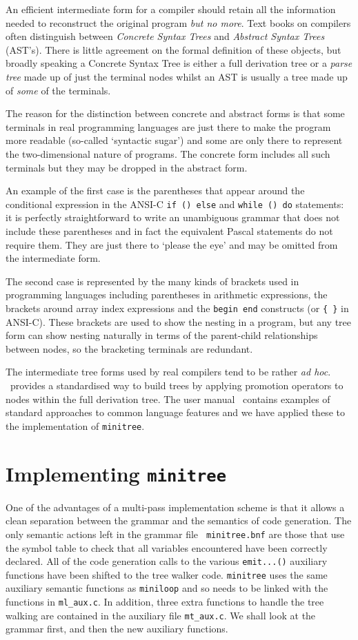 An efficient intermediate form for a compiler should retain all the
information needed to reconstruct the original program {\em but no
more}. Text books on compilers often distinguish between {\em Concrete
Syntax Trees} and {\em Abstract Syntax Trees} (AST's). There is little
agreement on the formal definition of these objects, but broadly
speaking a Concrete Syntax Tree is either a full derivation tree 
or a {\em parse tree} made
up of just the terminal nodes whilst an AST is usually a tree made up of
{\em some} of the terminals.

The reason for the distinction between concrete and abstract forms is that some
terminals in real programming languages are just there to make the
program more readable (so-called `syntactic sugar') and some are only
there to represent the two-dimensional nature of programs. The concrete form includes
all such terminals but they may be dropped in the abstract form.

An example of the first case is the parentheses that appear around the
conditional expression in the ANSI-C {\tt if () else} and {\tt while ()
do} statements: it is perfectly straightforward to write an unambiguous
grammar that does not include these parentheses and in fact the
equivalent Pascal statements do not require them. They are just there to `please the eye'
and may be omitted from the intermediate form.

The second case is represented by the many kinds of brackets used in programming
languages including parentheses in arithmetic expressions, the brackets around array index
expressions and the {\tt begin end} constructs (or {\tt \{ \}} in ANSI-C). These brackets are used
to show the nesting in a program, but any tree form can show nesting naturally in terms of
the parent-child relationships between nodes, so the bracketing terminals are redundant.

The intermediate tree forms used by real compilers tend to be rather
{\em ad hoc}. \rdp\ provides a standardised way to build trees by
applying promotion operators to nodes within the full derivation tree.
The user manual~\cite{rdp:user:1.5} contains examples of standard
approaches to common language features and we have applied these to the
implementation of {\tt minitree}. 

\section{Implementing {\tt minitree}} One of the advantages of a
multi-pass implementation scheme is that it
allows a clean separation between the grammar and the semantics of code
generation. The only semantic actions left in the grammar file {\tt
minitree.bnf} are those that use the symbol table to check that all
variables encountered have been correctly declared. All of the code
generation calls to the various {\tt emit...()} auxiliary functions have
been shifted to the tree walker code. {\tt minitree} uses the same
auxiliary semantic functions as {\tt miniloop} and so needs to be linked
with the functions in \verb|ml_aux.c|. In addition, three extra
functions to handle the tree walking are contained in the auxiliary file
\verb|mt_aux.c|. We shall look at the grammar first, and then the new
auxiliary functions.

